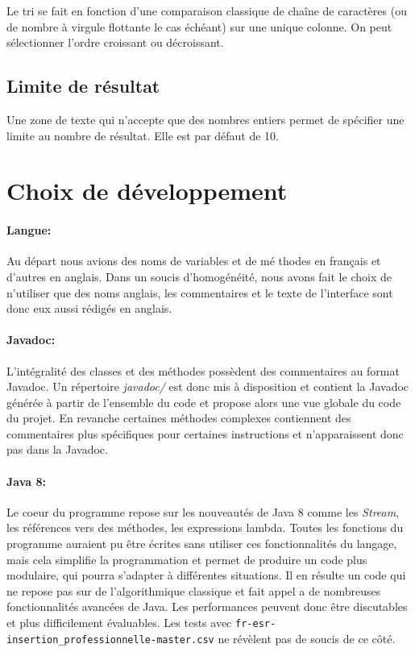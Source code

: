 \documentclass{article}
\begin{document}
Le tri se fait en fonction d'une comparaison classique de chaîne de caractères (ou de nombre à virgule flottante le cas échéant) sur une unique colonne. On peut sélectionner l'ordre croissant ou décroissant.

\subsection{Limite de résultat}

Une zone de texte qui n'accepte que des nombres entiers permet de spécifier une limite au nombre de résultat. Elle est par défaut de 10.

\section{Choix de développement}

\paragraph{Langue:} Au départ nous avions des noms de variables et de mé thodes en français et d'autres en anglais. Dans un soucis d'homogénéité, nous avons fait le choix de n'utiliser que des noms anglais, les commentaires et le texte de l'interface sont donc eux aussi rédigés en anglais.

\paragraph{Javadoc:} L'intégralité des classes et des méthodes possèdent des commentaires au format Javadoc. Un répertoire \textit{javadoc/} est donc mis à disposition et contient la Javadoc générée à partir de l'ensemble du code et propose alors une vue globale du code du projet. En revanche certaines méthodes complexes contiennent des commentaires plus spécifiques pour certaines instructions et n'apparaissent donc pas dans la Javadoc.

\paragraph{Java 8:} Le coeur du programme repose sur les nouveautés de Java 8 comme les \textit{Stream}, les références vers des méthodes, les expressions lambda. Toutes les fonctions du programme auraient pu être écrites sans utiliser ces fonctionnalités du langage, mais cela simplifie la programmation et permet de produire un code plus modulaire, qui pourra s'adapter à différentes situations. Il en résulte un code qui ne repose pas sur de l'algorithmique classique et fait appel a de nombreuses fonctionnalités avancées de Java. Les performances peuvent donc être discutables et plus difficilement évaluables. Les tests avec \texttt{fr-esr-insertion\_professionnelle-master.csv} ne révèlent pas de soucis de ce côté.
\end{document}

